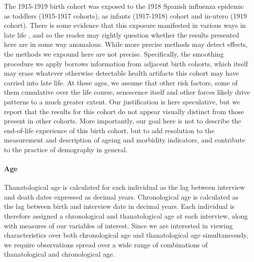 \documentclass[11pt,oneside]{article} %
\begin{document}
The 1915-1919 birth cohort was exposed to the 1918 Spanish influenza
epidemic as toddlers (1915-1917 cohorts), as infants (1917-1918) cohort and
in-utero (1919 cohort). There is some evidence that this exposure manifested in
various ways in late life \citep[e.g.,][]{almond20061918}, and so the reader may
rightly question whether the results presented here are in some way anomalous.
While more precise methods may detect effects, the methods we expound here are
not precise. Specifically, the smoothing procedure we apply borrows
information from adjacent birth cohorts, which itself may erase whatever
otherwise detectable health artifacts this cohort may have carried into late
life. At these ages, we assume that other risk factors, some of them cumulative
over the life course, senescence itself and other forces likely drive patterns
to a much greater extent. Our justification is here speculative, but we report
that the results for this cohort do not appear visually distinct from those
present in other cohorts. More importantly, our goal here is not to describe the
end-of-life experience of this birth cohort, but to add resolution to the
measurement and description of ageing and morbidity indicators, and contribute
to the practice of demography in general.

\paragraph*{Age}
Thanatological age is calculated for each individual as the lag between
interview and death dates expressed as decimal years. Chronological age is
calculated as the lag between birth and interview date in decimal years. Each
individual is therefore assigned a chronological and thanatological age at each
interview, along with measures of our variables of interest. Since
we are interested in viewing characteristics over both chronological age and
thanatological age simultaneously, we require observations spread over a wide
range of combinations of thanatological and chronological age.
\end{document}
